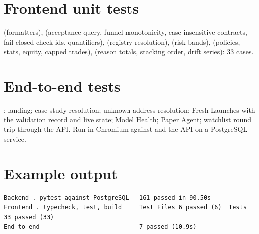 \section{Frontend unit tests}
 (formatters),  (acceptance query, funnel monotonicity, case-insensitive contracts, fail-closed check ids, quantifiers),  (registry resolution),  (risk bands),  (policies, stats, equity, capped trades),  (reason totals, stacking order, drift series): 33 cases.
\section{End-to-end tests}
: landing; case-study resolution; unknown-address resolution; Fresh Launches with the validation record and live state; Model Health; Paper Agent; watchlist round trip through the API. Run in Chromium against  and the API on a PostgreSQL service.
\section{Example output}
\begin{lstlisting}
Backend . pytest against PostgreSQL   161 passed in 90.50s
Frontend . typecheck, test, build     Test Files 6 passed (6)  Tests 33 passed (33)
End to end                            7 passed (10.9s)
\end{lstlisting}

